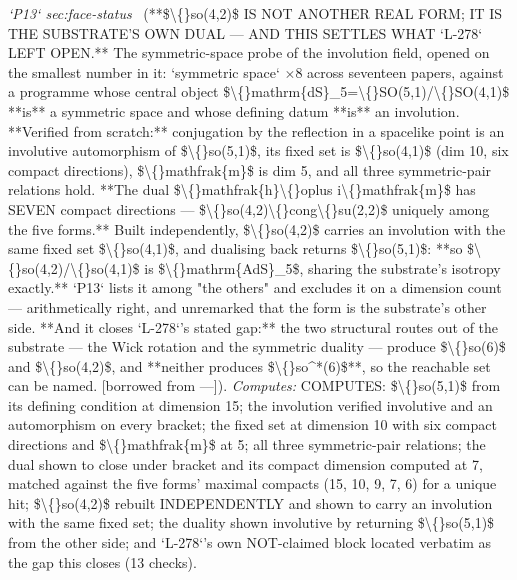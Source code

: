 \begin{description}
\textit{`P13` sec:face-status} \ (**\$\textbackslash\{\}so(4,2)\$ IS NOT ANOTHER REAL FORM; IT IS THE SUBSTRATE'S OWN DUAL --- AND THIS SETTLES WHAT `L-278` LEFT OPEN.** The symmetric-space probe of the involution field, opened on the smallest number in it: `symmetric space` \ensuremath{\times}8 across seventeen papers, against a programme whose central object \$\textbackslash\{\}mathrm\{dS\}\_5=\textbackslash\{\}SO(5,1)/\textbackslash\{\}SO(4,1)\$ **is** a symmetric space and whose defining datum **is** an involution. **Verified from scratch:** conjugation by the reflection in a spacelike point is an involutive automorphism of \$\textbackslash\{\}so(5,1)\$, its fixed set is \$\textbackslash\{\}so(4,1)\$ (dim 10, six compact directions), \$\textbackslash\{\}mathfrak\{m\}\$ is dim 5, and all three symmetric-pair relations hold. **The dual \$\textbackslash\{\}mathfrak\{h\}\textbackslash\{\}oplus i\textbackslash\{\}mathfrak\{m\}\$ has SEVEN compact directions --- \$\textbackslash\{\}so(4,2)\textbackslash\{\}cong\textbackslash\{\}su(2,2)\$ uniquely among the five forms.** Built independently, \$\textbackslash\{\}so(4,2)\$ carries an involution with the same fixed set \$\textbackslash\{\}so(4,1)\$, and dualising back returns \$\textbackslash\{\}so(5,1)\$: **so \$\textbackslash\{\}so(4,2)/\textbackslash\{\}so(4,1)\$ is \$\textbackslash\{\}mathrm\{AdS\}\_5\$, sharing the substrate's isotropy exactly.** `P13` lists it among "the others" and excludes it on a dimension count --- arithmetically right, and unremarked that the form is the substrate's other side. **And it closes `L-278`'s stated gap:** the two structural routes out of the substrate --- the Wick rotation and the symmetric duality --- produce \$\textbackslash\{\}so(6)\$ and \$\textbackslash\{\}so(4,2)\$, and **neither produces \$\textbackslash\{\}so\textasciicircum{}*(6)\$**, so the reachable set can be named. [borrowed from ---]). 
\emph{Computes:} COMPUTES: \$\textbackslash\{\}so(5,1)\$ from its defining condition at dimension 15; the involution verified involutive and an automorphism on every bracket; the fixed set at dimension 10 with six compact directions and \$\textbackslash\{\}mathfrak\{m\}\$ at 5; all three symmetric-pair relations; the dual shown to close under bracket and its compact dimension computed at 7, matched against the five forms' maximal compacts (15, 10, 9, 7, 6) for a unique hit; \$\textbackslash\{\}so(4,2)\$ rebuilt INDEPENDENTLY and shown to carry an involution with the same fixed set; the duality shown involutive by returning \$\textbackslash\{\}so(5,1)\$ from the other side; and `L-278`'s own NOT-claimed block located verbatim as the gap this closes (13 checks).

\end{description}
